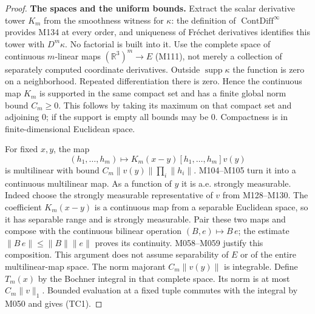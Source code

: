 \documentclass[11pt,a4paper]{article}
\theoremstyle{definition}
\theoremstyle{remark}
\begin{document}
\begin{proof}
\textbf{The spaces and the uniform bounds.}
Extract the scalar derivative tower $K_m$ from the smoothness witness
for $\kappa$: the definition of $\operatorname{ContDiff}^{\infty}$
provides M134 at every order, and uniqueness of Fr\'echet derivatives
identifies this tower with $D^m\kappa$. No factorial is built into it.
Use the complete space of continuous $m$-linear maps
$(\mathbb R^3)^m\to E$ (M111), not merely a collection of separately
computed coordinate derivatives. Outside $\operatorname{supp}\kappa$
the function is zero on a neighborhood. Repeated differentiation there
is zero. Hence the continuous map $K_m$ is supported in the same compact
set and has a finite global norm bound $C_m\geq0$. This follows by taking
its maximum on that compact set and adjoining $0$; if the support is
empty all bounds may be $0$. Compactness is in finite-dimensional
Euclidean space.

For fixed $x,y$, the map
\[
 (h_1,\ldots,h_m)\longmapsto K_m(x-y)[h_1,\ldots,h_m]v(y)
\]
is multilinear with bound $C_m\|v(y)\|\prod_i\|h_i\|$.
M104--M105 turn it into a continuous multilinear map.
As a function of $y$ it is a.e. strongly measurable. Indeed choose the
strongly measurable representative of $v$ from M128--M130. The coefficient
$K_m(x-y)$ is a continuous map from a separable Euclidean space, so it
has separable range and is strongly measurable. Pair these two maps and
compose with the continuous bilinear operation $(B,e)\mapsto B\,e$;
the estimate $\|B\,e\|\leq\|B\|\|e\|$ proves its continuity.
M058--M059 justify this composition. This argument does not assume
separability of $E$ or of the entire multilinear-map space.
The norm majorant $C_m\|v(y)\|$ is integrable. Define $T_m(x)$ by the
Bochner integral in that complete space. Its norm is at most
$C_m\|v\|_1$. Bounded evaluation at a fixed tuple commutes with the
integral by M050 and gives (TC1).


\end{proof}
\end{document}
